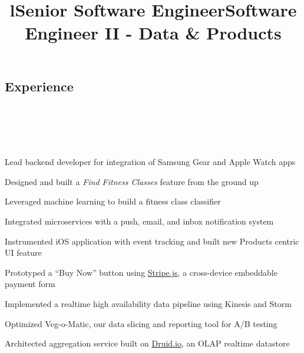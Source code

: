\documentclass[12pt, tweaklist, line]{res}
\let\tempone\itemize
\let\temptwo\enditemize
\renewenvironment{itemize}{\tempone\vspace{-.15in}\setlength{\topsep}{0pt}\setlength{\itemsep}{3pt}\vspace{-.15in}}{\temptwo}
\begin{document}

\begin{resume}

\section{Experience}
\begin{format}
  \\
  \title{l}\\
  \body\\
\end{format}

\title{Senior Software Engineer}
\begin{position}
\begin{itemize}
\item Lead backend developer for integration of Samsung Gear and Apple Watch apps
\item Designed and built a \textit{Find Fitness Classes} feature from the ground up
\item Leveraged machine learning to build a fitness class classifier
\item Integrated microservices with a push, email, and inbox notification system
\end{itemize}
\end{position}

\title{Software Engineer II - Data \& Products}
\begin{position}
\begin{itemize}
\item Instrumented iOS application with event tracking and built new Products centric UI feature
\item Prototyped a ``Buy Now'' button using \href{https://stripe.com/}{Stripe.js}, a cross-device embeddable payment form
\item Implemented a realtime high availability data pipeline using Kinesis and Storm
\item Optimized Veg-o-Matic, our data slicing and reporting tool for A/B testing
\item Architected aggregation service built on \href{http://druid.io/}{Druid.io}, an OLAP realtime datastore
\end{itemize}
\end{position}


\end{resume}
\end{document}
